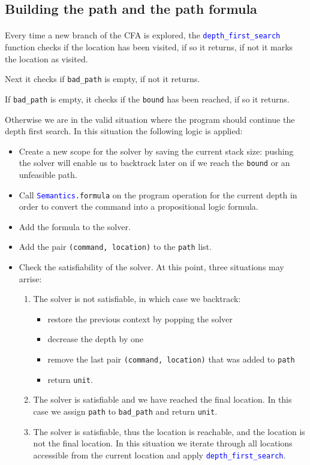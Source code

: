 \documentclass[letterpaper,12pt]{article}
\begin{document}
\subsection{Building the path and the path formula}
\paragraph{}
Every time a new branch of the CFA is explored, the \texttt{\textcolor{blue}{depth\_first\_search}} function checks if the location has been visited, if so it returns, if not it marks the location as visited. 

Next it checks if \texttt{bad\_path} is empty, if not it returns. 

If \texttt{bad\_path} is empty, it checks if the \texttt{bound} has been reached, if so it returns.

Otherwise we are in the valid situation where the program should continue the depth first search. In this situation the following logic is applied:

\begin{itemize}
\item Create a new scope for the solver by saving the current stack size: pushing the solver will enable us to backtrack later on if we reach the \texttt{bound} or an unfeasible path.
\item Call \texttt{\textcolor{blue}{Semantics.}formula} on the program operation for the current depth in order to convert the command into a propositional logic formula.
\item Add the formula to the solver.
\item Add the pair \texttt{(command, location)} to the \texttt{path} list.
\item Check the satisfiability of the solver. At this point, three situations may arrise:
\begin{enumerate}
\item{The solver is not satisfiable, in which case we backtrack:
\begin{itemize}
\item restore the previous context by popping the solver
\item decrease the depth by one
\item remove the last pair \texttt{(command, location)} that was added to \texttt{path}
\item return \texttt{unit}.
\end{itemize}
}
\item The solver is satisfiable and we have reached the final location. In this case we assign \texttt{path} to \texttt{bad\_path} and return \texttt{unit}.
\item The solver is satisfiable, thus the location is reachable, and the location is not the final location. In this situation we iterate through all locations accessible from the current location and apply \texttt{\textcolor{blue}{depth\_first\_search}}.
\end{enumerate}
\end{itemize}
\end{document}
